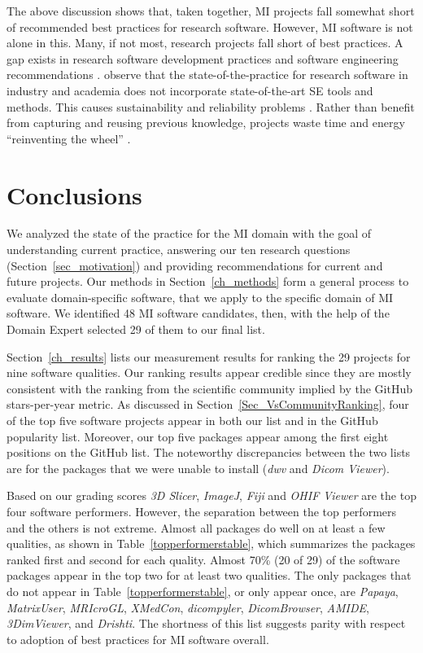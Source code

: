 \documentclass[11pt]{article}
\begin{document}
The above discussion shows that, taken together, MI projects fall somewhat short
of recommended best practices for research software.  However, MI software is
not alone in this.  Many, if not most, research projects fall short of best
practices.  A gap exists in research software development practices and software
engineering recommendations \citep{Storer2017, Kelly2007, OwojaiyeEtAl2021_CSE}.
\citet{JohansonAndHasselbring2018} observe that the state-of-the-practice for
research software in industry and academia does not incorporate state-of-the-art
SE tools and methods.  This causes sustainability and reliability problems
\citep{FaulkEtAl2009}. Rather than benefit from capturing and reusing previous
knowledge, projects waste time and energy ``reinventing the wheel''
\citep{deSouzaEtAl2019}.

\section{Conclusions} \label{ch_conclusions}

We analyzed the state of the practice for the MI domain with the goal of
understanding current practice, answering our ten research questions
(Section~\ref{sec_motivation}) and providing recommendations for current and
future projects.  Our methods in Section~\ref{ch_methods} form a general process
to evaluate domain-specific software, that we apply to the specific domain of MI
software. We identified 48 MI software candidates, then, with the help of the
Domain Expert selected 29 of them to our final list. 

Section~\ref{ch_results} lists our measurement results for ranking the 29
projects for nine software qualities. Our ranking results appear credible since
they are mostly consistent with the ranking from the scientific community
implied by the GitHub stars-per-year metric. As discussed in
Section~\ref{Sec_VsCommunityRanking}, four of the top five software projects
appear in both our list and in the GitHub popularity list.  Moreover, our top
five packages appear among the first eight positions on the GitHub list.  The
noteworthy discrepancies between the two lists are for the packages that we were
unable to install (\textit{dwv} and \textit{Dicom Viewer}).

Based on our grading scores \textit{3D Slicer}, \textit{ImageJ}, \textit{Fiji}
and \textit{OHIF Viewer} are the top four software performers.  However, the
separation between the top performers and the others is not extreme.  Almost all
packages do well on at least a few qualities, as shown in
Table~\ref{topperformerstable}, which summarizes the packages ranked first and
second for each quality. Almost 70\% (20 of 29) of the software packages appear
in the top two for at least two qualities.  The only packages that do not appear
in Table~\ref{topperformerstable}, or only appear once, are \textit{Papaya},
\textit{MatrixUser}, \textit{MRIcroGL}, \textit{XMedCon}, \textit{dicompyler},
\textit{DicomBrowser}, \textit{AMIDE}, \textit{3DimViewer}, and
\textit{Drishti}. The shortness of this list suggests parity with respect to
adoption of best practices for MI software overall.
\end{document}
